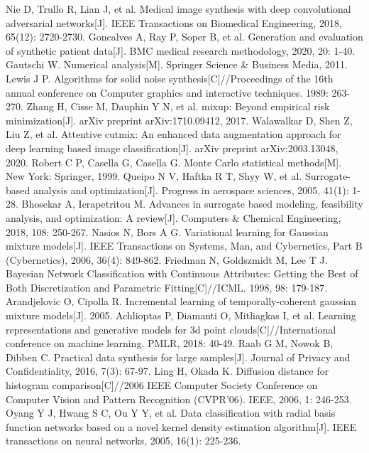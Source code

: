 \documentclass{NauThesis}
\begin{document}
\begin{thebibliography}{99}
Nie D, Trullo R, Lian J, et al. Medical image synthesis with deep convolutional adversarial networks[J]. IEEE Transactions on Biomedical Engineering, 2018, 65(12): 2720-2730.
Goncalves A, Ray P, Soper B, et al. Generation and evaluation of synthetic patient data[J]. BMC medical research methodology, 2020, 20: 1-40.
Gautschi W. Numerical analysis[M]. Springer Science \& Business Media, 2011.
Lewis J P. Algorithms for solid noise synthesis[C]//Proceedings of the 16th annual conference on Computer graphics and interactive techniques. 1989: 263-270.
Zhang H, Cisse M, Dauphin Y N, et al. mixup: Beyond empirical risk minimization[J]. arXiv preprint arXiv:1710.09412, 2017.
Walawalkar D, Shen Z, Liu Z, et al. Attentive cutmix: An enhanced data augmentation approach for deep learning based image classification[J]. arXiv preprint arXiv:2003.13048, 2020.
Robert C P, Casella G, Casella G. Monte Carlo statistical methods[M]. New York: Springer, 1999.
Queipo N V, Haftka R T, Shyy W, et al. Surrogate-based analysis and optimization[J]. Progress in aerospace sciences, 2005, 41(1): 1-28.
Bhosekar A, Ierapetritou M. Advances in surrogate based modeling, feasibility analysis, and optimization: A review[J]. Computers \& Chemical Engineering, 2018, 108: 250-267.
Nasios N, Bors A G. Variational learning for Gaussian mixture models[J]. IEEE Transactions on Systems, Man, and Cybernetics, Part B (Cybernetics), 2006, 36(4): 849-862.
Friedman N, Goldszmidt M, Lee T J. Bayesian Network Classification with Continuous Attributes: Getting the Best of Both Discretization and Parametric Fitting[C]//ICML. 1998, 98: 179-187.
Arandjelovic O, Cipolla R. Incremental learning of temporally-coherent gaussian mixture models[J]. 2005.
Achlioptas P, Diamanti O, Mitliagkas I, et al. Learning representations and generative models for 3d point clouds[C]//International conference on machine learning. PMLR, 2018: 40-49.
Raab G M, Nowok B, Dibben C. Practical data synthesis for large samples[J]. Journal of Privacy and Confidentiality, 2016, 7(3): 67-97.
Ling H, Okada K. Diffusion distance for histogram comparison[C]//2006 IEEE Computer Society Conference on Computer Vision and Pattern Recognition (CVPR'06). IEEE, 2006, 1: 246-253.
Oyang Y J, Hwang S C, Ou Y Y, et al. Data classification with radial basis function networks based on a novel kernel density estimation algorithm[J]. IEEE transactions on neural networks, 2005, 16(1): 225-236.

\end{thebibliography}
\end{document}

